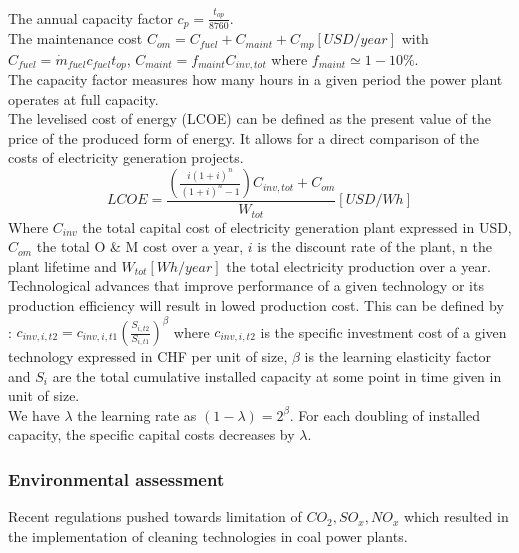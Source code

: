 \documentclass[../main.tex]{subfiles}
\begin{document}
The annual capacity factor $c_p = \frac{t_{op}}{8760}$.\\
The maintenance cost $C_{om} = C_{fuel} + C_{maint} + C_{mp} [USD/year]$ with $C_{fuel} = \dot{m}_{fuel} c_{fuel} t_{op}$, $C_{maint} = f_{maint} C_{inv,tot}$ where $f_{maint} \simeq 1-10\%$.\\

The capacity factor measures how many hours in a given period the power plant operates at full capacity.\\

The levelised cost of energy (LCOE) can be defined as the present value of the price of the produced form of energy. It allows for a direct comparison of the costs of electricity generation projects.\\
\begin{equation}
    LCOE = \frac{(\frac{i(1+i)^n}{(1+i)^n-1})C_{inv,tot} + C_{om}}{W_{tot}} [USD/Wh]
\end{equation}
Where $C_{inv}$ the total capital cost of electricity generation plant expressed in USD, $C_{om}$ the total O \& M cost over a year, $i$ is the discount rate of the plant, n the plant lifetime and $W_{tot} [Wh/year]$ the total electricity production over a year.\\


Technological advances that improve performance of a given technology or its production efficiency will result in lowed production cost. This can be defined by : $c_{inv, i, t2} = c_{inv, i, t1} (\frac{S_{i,t2}}{S_{i,t1}})^\beta$ where $c_{inv,i,t2}$ is the specific investment cost of a given technology expressed in CHF per unit of size, $\beta$ is the learning elasticity factor and $S_i$ are the total cumulative installed capacity at some point in time given in unit of size.\\

We have $\lambda$ the learning rate as $(1-\lambda) = 2^\beta$. For each doubling of installed capacity, the specific capital costs decreases by $\lambda$.\\

\subsubsection{Environmental assessment}

Recent regulations pushed towards limitation of $CO_2, SO_x, NO_x$ which resulted in the implementation of cleaning technologies in coal power plants.\\
\end{document}
